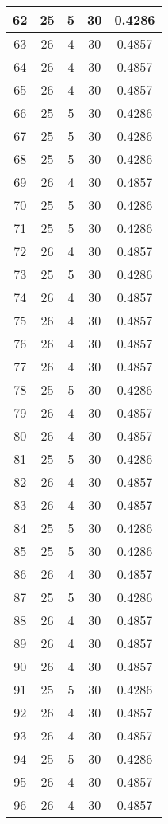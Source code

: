 \documentclass[letterpaper, 12pt]{article}
\begin{document}
\begin{longtable}{|c|c|c|c|c|}
\hline
62 & 25 & 5 & 30 & 0.4286 \\
\hline
63 & 26 & 4 & 30 & 0.4857 \\
\hline
64 & 26 & 4 & 30 & 0.4857 \\
\hline
65 & 26 & 4 & 30 & 0.4857 \\
\hline
66 & 25 & 5 & 30 & 0.4286 \\
\hline
67 & 25 & 5 & 30 & 0.4286 \\
\hline
68 & 25 & 5 & 30 & 0.4286 \\
\hline
69 & 26 & 4 & 30 & 0.4857 \\
\hline
70 & 25 & 5 & 30 & 0.4286 \\
\hline
71 & 25 & 5 & 30 & 0.4286 \\
\hline
72 & 26 & 4 & 30 & 0.4857 \\
\hline
73 & 25 & 5 & 30 & 0.4286 \\
\hline
74 & 26 & 4 & 30 & 0.4857 \\
\hline
75 & 26 & 4 & 30 & 0.4857 \\
\hline
76 & 26 & 4 & 30 & 0.4857 \\
\hline
77 & 26 & 4 & 30 & 0.4857 \\
\hline
78 & 25 & 5 & 30 & 0.4286 \\
\hline
79 & 26 & 4 & 30 & 0.4857 \\
\hline
80 & 26 & 4 & 30 & 0.4857 \\
\hline
81 & 25 & 5 & 30 & 0.4286 \\
\hline
82 & 26 & 4 & 30 & 0.4857 \\
\hline
83 & 26 & 4 & 30 & 0.4857 \\
\hline
84 & 25 & 5 & 30 & 0.4286 \\
\hline
85 & 25 & 5 & 30 & 0.4286 \\
\hline
86 & 26 & 4 & 30 & 0.4857 \\
\hline
87 & 25 & 5 & 30 & 0.4286 \\
\hline
88 & 26 & 4 & 30 & 0.4857 \\
\hline
89 & 26 & 4 & 30 & 0.4857 \\
\hline
90 & 26 & 4 & 30 & 0.4857 \\
\hline
91 & 25 & 5 & 30 & 0.4286 \\
\hline
92 & 26 & 4 & 30 & 0.4857 \\
\hline
93 & 26 & 4 & 30 & 0.4857 \\
\hline
94 & 25 & 5 & 30 & 0.4286 \\
\hline
95 & 26 & 4 & 30 & 0.4857 \\
\hline
96 & 26 & 4 & 30 & 0.4857 \\

\end{longtable}
\end{document}
